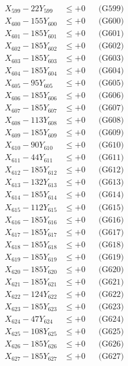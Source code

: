 \documentclass[a4paper,10pt]{article}
\begin{document}
{\begin{align}
X_{599} - 22Y_{599} &\leq +0 && \text{(G599)} \\
X_{600} - 155Y_{600} &\leq +0 && \text{(G600)} \\
\allowbreak
X_{601} - 185Y_{601} &\leq +0 && \text{(G601)} \\
X_{602} - 185Y_{602} &\leq +0 && \text{(G602)} \\
X_{603} - 185Y_{603} &\leq +0 && \text{(G603)} \\
X_{604} - 185Y_{604} &\leq +0 && \text{(G604)} \\
X_{605} - 95Y_{605} &\leq +0 && \text{(G605)} \\
X_{606} - 185Y_{606} &\leq +0 && \text{(G606)} \\
X_{607} - 185Y_{607} &\leq +0 && \text{(G607)} \\
X_{608} - 113Y_{608} &\leq +0 && \text{(G608)} \\
X_{609} - 185Y_{609} &\leq +0 && \text{(G609)} \\
X_{610} - 90Y_{610} &\leq +0 && \text{(G610)} \\
\allowbreak
X_{611} - 44Y_{611} &\leq +0 && \text{(G611)} \\
X_{612} - 185Y_{612} &\leq +0 && \text{(G612)} \\
X_{613} - 132Y_{613} &\leq +0 && \text{(G613)} \\
X_{614} - 185Y_{614} &\leq +0 && \text{(G614)} \\
X_{615} - 112Y_{615} &\leq +0 && \text{(G615)} \\
X_{616} - 185Y_{616} &\leq +0 && \text{(G616)} \\
X_{617} - 185Y_{617} &\leq +0 && \text{(G617)} \\
X_{618} - 185Y_{618} &\leq +0 && \text{(G618)} \\
X_{619} - 185Y_{619} &\leq +0 && \text{(G619)} \\
X_{620} - 185Y_{620} &\leq +0 && \text{(G620)} \\
\allowbreak
X_{621} - 185Y_{621} &\leq +0 && \text{(G621)} \\
X_{622} - 124Y_{622} &\leq +0 && \text{(G622)} \\
X_{623} - 185Y_{623} &\leq +0 && \text{(G623)} \\
X_{624} - 47Y_{624} &\leq +0 && \text{(G624)} \\
X_{625} - 108Y_{625} &\leq +0 && \text{(G625)} \\
X_{626} - 185Y_{626} &\leq +0 && \text{(G626)} \\
X_{627} - 185Y_{627} &\leq +0 && \text{(G627)} \\

\end{align}}
\end{document}
